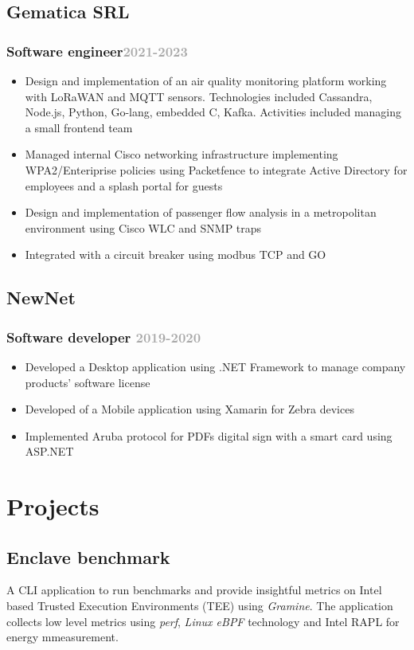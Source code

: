 \documentclass[11pt,a4paper]{article}
\begin{document}
  \subsection{Gematica SRL}
  \subsubsection{Software engineer\hfill \textcolor{darkgray}{\small{2021-2023}}}
  \begin{itemize}
    \item Design and implementation of an air quality monitoring platform working with LoRaWAN and MQTT sensors. Technologies included Cassandra, Node.js, Python, Go-lang, embedded C, Kafka. Activities included managing a small frontend team
    \item Managed internal Cisco networking infrastructure implementing WPA2/Enteriprise policies using Packetfence to integrate Active Directory for employees and a splash portal for guests
    \item Design and implementation of passenger flow analysis in a metropolitan environment using Cisco WLC and SNMP traps
    \item Integrated with a circuit breaker using modbus TCP and GO
  \end{itemize}

  \subsection{NewNet}
  \subsubsection{Software developer \hfill \textcolor{darkgray}{\small{2019-2020}}}
  \begin{itemize}
    \item Developed a Desktop application using .NET Framework to manage company products'  software license
    \item Developed of a Mobile application using Xamarin for Zebra devices
    \item Implemented Aruba protocol for PDFs digital sign with a smart card using ASP.NET
  \end{itemize}

  \section{Projects}
  \subsection{Enclave benchmark \href{https://github.com/alarmfox/enclave-benchmark} {\faGithub}}
  A CLI application to run benchmarks and provide insightful metrics on Intel based Trusted Execution Environments (TEE) using \textit{Gramine}. The application collects low level metrics using \textit{perf}, \textit{Linux eBPF} technology and Intel RAPL for energy mmeasurement. \\
\end{document}
